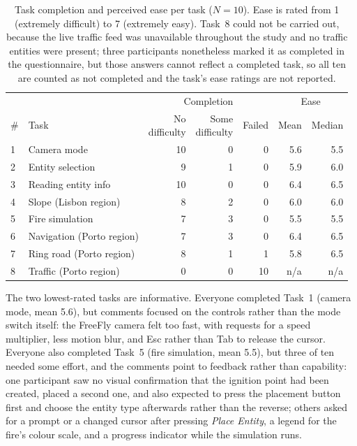 \begin{table}[t]
  \centering
  \caption[User study task outcomes]{Task completion and perceived ease per task (\(N=10\)). Ease is rated from 1 (extremely difficult) to 7 (extremely easy). Task~8 could not be carried out, because the live traffic feed was unavailable throughout the study and no traffic entities were present; three participants nonetheless marked it as completed in the questionnaire, but those answers cannot reflect a completed task, so all ten are counted as not completed and the task's ease ratings are not reported.}
  \label{tab:user-tasks}
  \small
  \begin{tabular}{llrrrrr}
    \hline
    & & \multicolumn{3}{c}{Completion} & \multicolumn{2}{c}{Ease} \\
    \# & Task & \shortstack[r]{No\\difficulty} & \shortstack[r]{Some\\difficulty} & Failed & Mean & Median \\
    \hline
    1 & Camera mode              & 10 & 0 & 0  & 5.6 & 5.5 \\
    2 & Entity selection         & 9  & 1 & 0  & 5.9 & 6.0 \\
    3 & Reading entity info      & 10 & 0 & 0  & 6.4 & 6.5 \\
    4 & Slope (Lisbon region)    & 8  & 2 & 0  & 6.0 & 6.0 \\
    5 & Fire simulation          & 7  & 3 & 0  & 5.5 & 5.5 \\
    6 & Navigation (Porto region) & 7  & 3 & 0  & 6.4 & 6.5 \\
    7 & Ring road (Porto region) & 8  & 1 & 1  & 5.8 & 6.5 \\
    8 & Traffic (Porto region)   & 0  & 0 & 10 & n/a & n/a \\
    \hline
  \end{tabular}
\end{table}

The two lowest-rated tasks are informative. Everyone completed Task~1 (camera mode, mean 5.6), but comments focused on the controls rather than the mode switch itself: the FreeFly camera felt too fast, with requests for a speed multiplier, less motion blur, and Esc rather than Tab to release the cursor. Everyone also completed Task~5 (fire simulation, mean 5.5), but three of ten needed some effort, and the comments point to feedback rather than capability: one participant saw no visual confirmation that the ignition point had been created, placed a second one, and also expected to press the placement button first and choose the entity type afterwards rather than the reverse; others asked for a prompt or a changed cursor after pressing \emph{Place Entity}, a legend for the fire's colour scale, and a progress indicator while the simulation runs.

